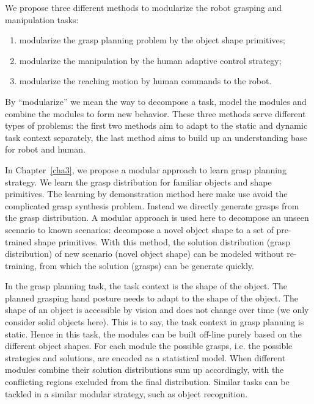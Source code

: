 We propose three different methods to modularize the robot grasping and manipulation tasks:

\begin{enumerate}
\item modularize the grasp planning problem by the object shape primitives;
\item modularize the manipulation by the human adaptive control strategy;
\item modularize the reaching motion by human commands to the robot.
\end{enumerate}
By ``modularize'' we mean the way to decompose a task, model the modules and combine the modules to form new behavior. These three methods serve different types of problems: the first two methods aim to adapt to the static and dynamic task context separately, the last method aims to build up an understanding base for robot and human.


In Chapter~\ref{cha3}, we propose a modular approach to learn grasp planning strategy. We learn the grasp distribution for familiar objects and shape primitives. The learning by demonstration method here make use avoid the complicated grasp synthesis problem. Instead we directly generate grasps from the grasp distribution. A modular approach is used here to decompose an unseen scenario to known scenarios: decompose a novel object shape to a set of pre-trained shape primitives. With this method, the solution distribution (grasp distribution) of new scenario (novel object shape) can be modeled without re-training, from which the solution (grasps) can be generate quickly.

In the grasp planning task, the task context is the shape of the object. The planned grasping hand posture needs to adapt to the shape of the object. The shape of an object is accessible by vision and does not change over time (we only consider solid objects here). This is to say, the task context in grasp planning is static. Hence in this task, the modules can be built off-line purely based on the different object shapes. For each module the possible grasps, i.e. the possible strategies and solutions, are encoded as a statistical model.
When different modules combine their solution distributions sum up accordingly, with the conflicting regions excluded from the final distribution. Similar tasks can be tackled in a similar modular strategy, such as object recognition.

